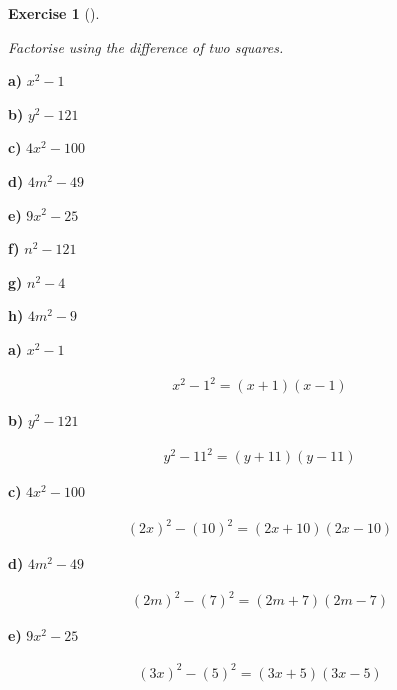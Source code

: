 \documentclass[
  letterpaper,
  DIV=11,
  numbers=noendperiod]{scrreprt}
\theoremstyle{definition}
\newtheorem{exercise}{Exercise}[chapter]
\theoremstyle{remark}
\begin{document}
\begin{exercise}[]\protect\hypertarget{exr-u6-6}{}\label{exr-u6-6}

\emph{Factorise using the difference of two squares.}

\textbf{a)} \(\displaystyle x^2 - 1\)

\textbf{b)} \(\displaystyle y^2 - 121\)

\textbf{c)} \(\displaystyle 4x^2 - 100\)

\textbf{d)} \(\displaystyle 4m^2 - 49\)

\textbf{e)} \(\displaystyle 9x^2 - 25\)

\textbf{f)} \(\displaystyle n^2 - 121\)

\textbf{g)} \(\displaystyle n^2 - 4\)

\textbf{h)} \(\displaystyle 4m^2 - 9\)

\begin{tcolorbox}[enhanced jigsaw, opacitybacktitle=0.6, coltitle=black, arc=.35mm, colframe=quarto-callout-tip-color-frame, colback=white, bottomrule=.15mm, left=2mm, colbacktitle=quarto-callout-tip-color!10!white, titlerule=0mm, opacityback=0, title=\textcolor{quarto-callout-tip-color}{\faLightbulb}\hspace{0.5em}{🔍 View Solutions}, leftrule=.75mm, breakable, rightrule=.15mm, bottomtitle=1mm, toptitle=1mm, toprule=.15mm]

\textbf{a)} \(\displaystyle x^2 - 1\)

\begin{align*}
x^2 - 1^2 = (x + 1)(x - 1)
\end{align*}

\textbf{b)} \(\displaystyle y^2 - 121\)

\begin{align*}
y^2 - 11^2 = (y + 11)(y - 11)
\end{align*}

\textbf{c)} \(\displaystyle 4x^2 - 100\)

\begin{align*}
(2x)^2 - (10)^2 = (2x + 10)(2x - 10)
\end{align*}

\textbf{d)} \(\displaystyle 4m^2 - 49\)

\begin{align*}
(2m)^2 - (7)^2 = (2m + 7)(2m - 7)
\end{align*}

\textbf{e)} \(\displaystyle 9x^2 - 25\)

\begin{align*}
(3x)^2 - (5)^2 = (3x + 5)(3x - 5)
\end{align*}


\end{tcolorbox}
\end{exercise}
\end{document}
